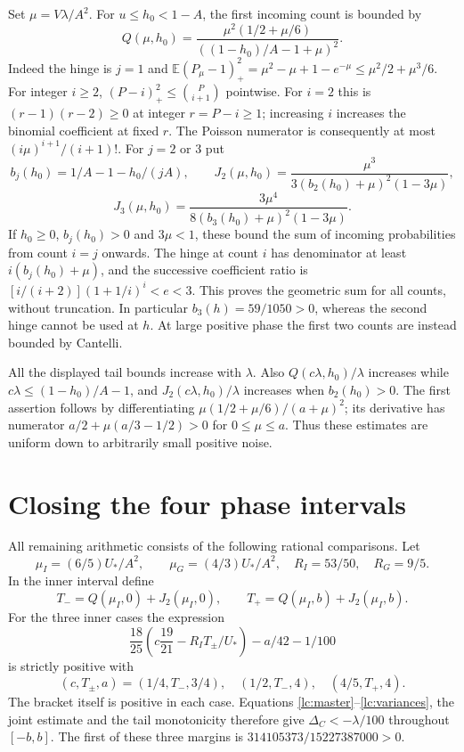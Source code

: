 \documentclass[11pt]{article}
\newcommand{\E}{\mathbb E}
\begin{document}
Set $\mu=V\lambda/A^2$. For $u\le h_0<1-A$, the first incoming
count is bounded by
\[
 Q(\mu,h_0)=\frac{\mu^2(1/2+\mu/6)}{((1-h_0)/A-1+\mu)^2}.
\]
Indeed the hinge is $j=1$ and
$\E(P_\mu-1)_+^2=\mu^2-\mu+1-e^{-\mu}\le\mu^2/2+\mu^3/6$.
For integer $i\ge2$, $(P-i)_+^2\le\binom P{i+1}$ pointwise.
For $i=2$ this is $(r-1)(r-2)\ge0$ at integer $r=P-i\ge1$;
increasing $i$ increases the binomial coefficient at fixed $r$.
The Poisson numerator is consequently at most $(i\mu)^{i+1}/(i+1)!$.
For $j=2$ or $3$ put
\[
 b_j(h_0)=1/A-1-h_0/(jA),\qquad
 J_2(\mu,h_0)=\frac{\mu^3}{3(b_2(h_0)+\mu)^2(1-3\mu)},
\]
\[
 J_3(\mu,h_0)=\frac{3\mu^4}{8(b_3(h_0)+\mu)^2(1-3\mu)}.
\]
If $h_0\ge0$, $b_j(h_0)>0$ and $3\mu<1$, these bound the sum
of incoming probabilities from count $i=j$ onwards. The hinge at count
$i$ has denominator at least $i(b_j(h_0)+\mu)$, and the successive
coefficient ratio is
$[i/(i+2)](1+1/i)^i<e<3$.
This proves the geometric sum for all counts, without truncation.
In particular $b_3(h)=59/1050>0$, whereas the second hinge cannot be
used at $h$. At large positive phase the first two counts are instead
bounded by Cantelli.

All the displayed tail bounds increase with $\lambda$. Also
$Q(c\lambda,h_0)/\lambda$ increases while
$c\lambda\le(1-h_0)/A-1$, and $J_2(c\lambda,h_0)/\lambda$ increases
when $b_2(h_0)>0$. The first assertion follows by differentiating
$\mu(1/2+\mu/6)/(a+\mu)^2$; its derivative has numerator
$a/2+\mu(a/3-1/2)>0$ for $0\le\mu\le a$.
Thus these estimates are uniform down to arbitrarily small positive noise.

\section{Closing the four phase intervals}
All remaining arithmetic consists of the following rational comparisons.
Let
\[
 \mu_I=(6/5)U_*/A^2,\qquad \mu_G=(4/3)U_*/A^2,
 \quad R_I=53/50,\quad R_G=9/5.
\]
In the inner interval define
\[
 T_-=Q(\mu_I,0)+J_2(\mu_I,0),\qquad
 T_+=Q(\mu_I,b)+J_2(\mu_I,b).
\]
For the three inner cases the expression
\[
 \frac{18}{25}\left(c\frac{19}{21}-R_I T_\pm/U_*\right)
                         -a/42-1/100
\]
is strictly positive with
\[
 (c,T_\pm,a)=(1/4,T_-,3/4),\quad(1/2,T_-,4),\quad(4/5,T_+,4).
\]
The bracket itself is positive in each case. Equations
\eqref{lc:master}--\eqref{lc:variances}, the joint estimate and the
tail monotonicity therefore give $\Delta_C<-\lambda/100$ throughout
$[-b,b]$. The first of these three margins is
$314105373/15227387000>0$.
\end{document}
